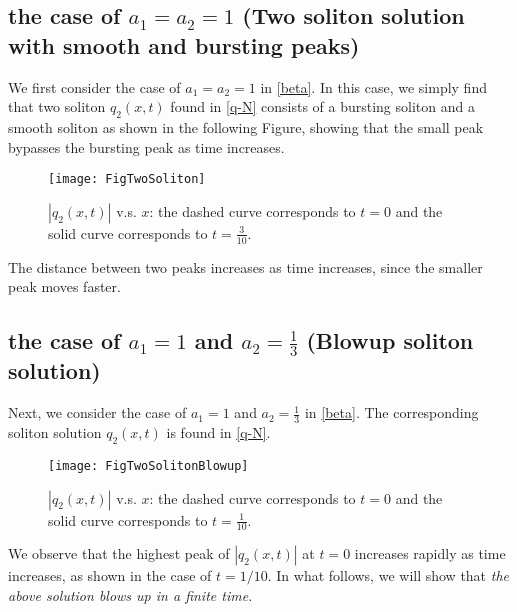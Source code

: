 \documentclass[11pt]{article}
\begin{document}
\subsection{the case of $a_1=a_2=1$ (Two soliton solution with smooth and bursting peaks) } We first consider the case of $a_1=a_2=1$ in \eqref{beta}. In this case, we simply find that two soliton $q_2(x,t)$ found in \eqref{q-N} consists of a bursting soliton and a smooth soliton as shown in the following Figure, showing that the small peak bypasses the bursting peak as time increases. 
\begin{figure}[htbp] %
   \centering
   \texttt{[image: FigTwoSoliton]} 
   \caption{$|q_2(x,t)| $ v.s. $x$: the dashed curve corresponds to $t=0$ and the solid curve corresponds to $t=\frac{3}{10}$.}
   \label{figTwosoliton}
\end{figure}

The distance between two peaks increases as time increases, since the smaller peak moves faster.


\newpage
\subsection{the case of $a_1=1$ and $a_2=\frac{1}{3}$ (Blowup soliton solution)} \label{blowup-section} Next, we consider the case of $a_1=1$ and $a_2=\frac{1}{3}$ in \eqref{beta}. The corresponding soliton solution $q_2(x,t)$ is found in \eqref{q-N}. 
\begin{figure}[htbp] %
   \centering
   \texttt{[image: FigTwoSolitonBlowup]} 
   \caption{$|q_2(x,t)| $ v.s. $x$: the dashed curve corresponds to $t=0$ and the solid curve corresponds to $t=\frac{1}{10}$.}
   \label{fig6}
\end{figure}

We observe that the highest peak of $|q_2(x,t)|$ at $t=0$ increases rapidly as time increases, as shown in the case of $t=1/10$. In what follows, we will show that \emph{the above solution blows up in a finite time.}
\end{document}
